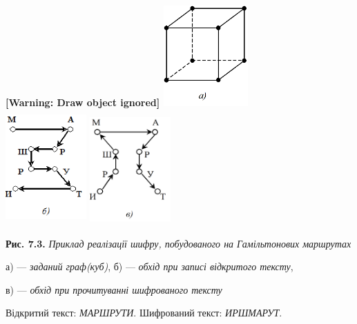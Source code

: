 {{{{{{{{{{{{{{{{{\bigskip

{\centering\bfseries
[Warning: Draw object ignored]
\includegraphics[width=1.2811in,height=1.5209in]{crypt-img/crypt-img69.png}
\ \ \ \ 
\includegraphics[width=1.2189in,height=1.7335in]{crypt-img/crypt-img70.png} 
\includegraphics[width=1.2189in,height=1.6665in]{crypt-img/crypt-img71.png} 
\par}


\bigskip

$$\textbf{Рис. 7.3. }\textit{Приклад реалізації шифру, побудованого на
Гамільтонових маршрутах}
\par}

$$а) --- \textit{заданий граф(куб)}, б) --- \textit{обхід при записі відкритого
тексту}, 
\par}

$$в) --- \textit{обхід при прочитуванні шифрованого тексту}
\par}

$$Відкритий текст: \textit{МАРШРУТИ}. Шифрований текст: \textit{ИРШМАРУТ}.
\par}


\bigskip

}}}}}}}}}}}}}

